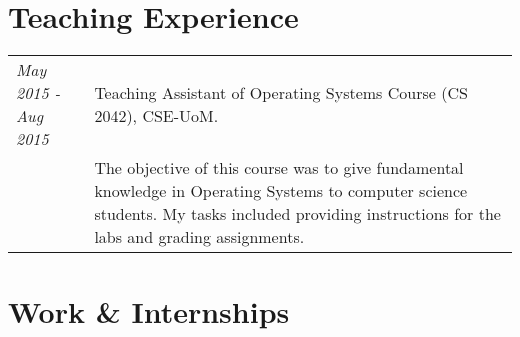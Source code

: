 \documentclass[a4paper,10pt]{article}
\begin{document}
\section{Teaching Experience}
\begin{tabular}{p{3cm}|p{13.5cm}}

\emph{May 2015 - Aug 2015} & Teaching Assistant of Operating Systems Course (CS 2042), CSE-UoM.\\
&\footnotesize{The objective of this course was to give fundamental knowledge in Operating Systems to computer science students. My tasks included providing instructions for the labs and grading assignments.}
\end{tabular}


\section{Work \& Internships}
\end{document}
